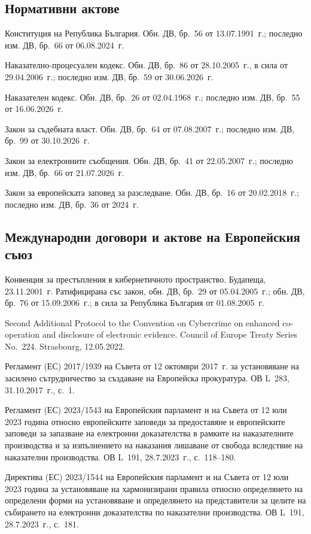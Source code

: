 {\subsection*{Нормативни актове}
\begin{biblist}[resume*=bib]
\item Конституция на Република България. Обн. ДВ, бр.~56 от 13.07.1991~г.; последно изм.
  ДВ, бр.~66 от 06.08.2024~г.
\item Наказателно-процесуален кодекс. Обн. ДВ, бр.~86 от 28.10.2005~г., в сила от
  29.04.2006~г.; последно изм. ДВ, бр.~59 от 30.06.2026~г.
\item Наказателен кодекс. Обн. ДВ, бр.~26 от 02.04.1968~г.; последно изм. ДВ, бр.~55 от
  16.06.2026~г.
\item Закон за съдебната власт. Обн. ДВ, бр.~64 от 07.08.2007~г.; последно изм. ДВ,
  бр.~99 от 30.10.2026~г.
\item Закон за електронните съобщения. Обн. ДВ, бр.~41 от 22.05.2007~г.; последно изм.
  ДВ, бр.~66 от 21.07.2026~г.
\item Закон за европейската заповед за разследване. Обн. ДВ, бр.~16 от 20.02.2018~г.;
  последно изм. ДВ, бр.~36 от 2024~г.
\end{biblist}

\subsection*{Международни договори и актове на Европейския съюз}
\begin{biblist}[resume*=bib]
\item Конвенция за престъпления в кибернетичното пространство. Будапеща, 23.11.2001~г.
  Ратифицирана със закон, обн. ДВ, бр.~29 от 05.04.2005~г.; обн. ДВ, бр.~76 от
  15.09.2006~г.; в сила за Република България от 01.08.2005~г.
\item Second Additional Protocol to the Convention on Cybercrime on enhanced co-operation and
  disclosure of electronic evidence. Council of Europe Treaty Series No.~224. Strasbourg,
  12.05.2022.
\item Регламент (ЕС) 2017/1939 на Съвета от 12 октомври 2017~г. за установяване на засилено
  сътрудничество за създаване на Европейска прокуратура. ОВ L~283, 31.10.2017~г., с.~1.
\item Регламент (ЕС) 2023/1543 на Европейския парламент и на Съвета от 12 юли 2023 година
  относно европейските заповеди за предоставяне и европейските заповеди за запазване на
  електронни доказателства в рамките на наказателните производства и за изпълнението на
  наказания лишаване от свобода вследствие на наказателни производства. ОВ L~191,
  28.7.2023~г., с.~118--180.
\item Директива (ЕС) 2023/1544 на Европейския парламент и на Съвета от 12 юли 2023 година
  за установяване на хармонизирани правила относно определянето на определени форми на
  установяване и определянето на представители за целите на събирането на електронни
  доказателства по наказателни производства. ОВ L~191, 28.7.2023~г., с.~181.
\end{biblist}

}
